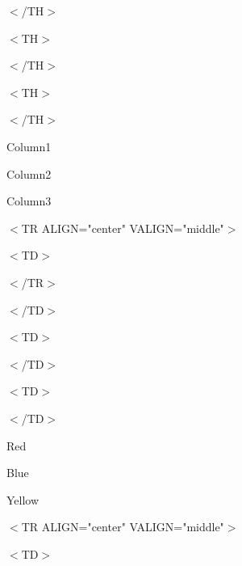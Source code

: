 \documentclass[a4paper,11pt]{book}
\begin{document}
\noindent $<$/TH$>$

\noindent $<$TH$>$

\noindent 

\noindent $<$/TH$>$

\noindent $<$TH$>$

\noindent 

\noindent $<$/TH$>$

\noindent Column1

\noindent 

\noindent 

\noindent Column2

\noindent 

\noindent 

\noindent Column3

\noindent $<$TR ALIGN="center" VALIGN="middle"$>$

\noindent $<$TD$>$

\noindent 

\noindent 

\noindent 

\noindent 

\noindent 

\noindent 

\noindent 

\noindent $<$/TR$>$

\noindent 

\noindent $<$/TD$>$

\noindent $<$TD$>$

\noindent 

\noindent $<$/TD$>$

\noindent $<$TD$>$

\noindent 

\noindent $<$/TD$>$

\noindent Red

\noindent 

\noindent 

\noindent Blue

\noindent 

\noindent 

\noindent Yellow

\noindent $<$TR ALIGN="center" VALIGN="middle"$>$

\noindent $<$TD$>$

\noindent 

\noindent 

\noindent 

\noindent 

\noindent 
\end{document}
